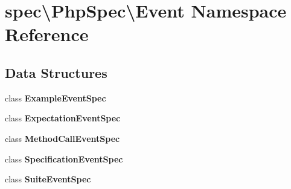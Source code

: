 \section{spec\textbackslash{}Php\+Spec\textbackslash{}Event Namespace Reference}
\label{namespacespec_1_1_php_spec_1_1_event}
\subsection*{Data Structures}
\begin{DoxyCompactItemize}
\item 
class {\bf Example\+Event\+Spec}
\item 
class {\bf Expectation\+Event\+Spec}
\item 
class {\bf Method\+Call\+Event\+Spec}
\item 
class {\bf Specification\+Event\+Spec}
\item 
class {\bf Suite\+Event\+Spec}
\end{DoxyCompactItemize}
